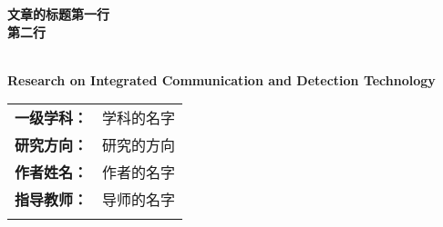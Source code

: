 \begin{titlepage}
    \centering
    \thispagestyle{empty} 
    \erhao \textbf{文章的标题第一行\\第二行}  %

    \Large \textbf{\\ Research on Integrated Communication and Detection Technology} %

    \vfill

    \begin{table}[!b]
        \centering
        \fontsize{12pt}{20pt}\selectfont
        \begin{tabular}{rm{}}
            \textbf{一级学科：} & 学科的名字 \\ \cline{2-2}
            \textbf{研究方向：} & 研究的方向 \\ \cline{2-2}
            \textbf{作者姓名：} & 作者的名字 \\ \cline{2-2}
            \textbf{指导教师：} & 导师的名字 \\ \cline{2-2}
            \multicolumn{2}{c}{}
            \label{tab:Names}
        \end{tabular}
    \end{table}


\end{titlepage}

